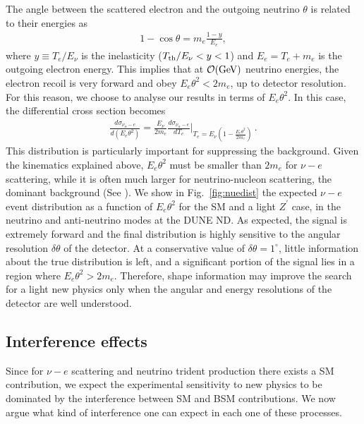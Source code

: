 The angle between the scattered electron and the outgoing neutrino $\theta$ is related to their energies as 
%
\begin{align*} 
1 - \cos{\theta} = m_e \frac{1 - y}{E_e}, 
\end{align*}
%
where $y \equiv T_e/E_{\nu}$ is the inelasticity ($T_{\rm th}/E_{\nu}<y<1$) and $E_e=T_e+m_e$ is the outgoing electron energy. This implies that at ${\cal O}(\rm GeV)$ neutrino energies, the electron recoil is very forward and obey $E_e \theta^2 < 2 m_e$, up to detector resolution. For this reason, we choose to analyse our results in terms of  $E_e \theta^2$. In this case, the differential cross section becomes
\begin{eqnarray}
  \frac{d\sigma_{\nu_{\alpha}-e}}{d(E_e\theta^2)} =\frac{E_\nu}{2m_e}\frac{d\sigma_{\nu_{\alpha}-e}}{dT_e} \Bigg|_{T_e=E_\nu(1-\frac{E_e\theta^2}{2m_e})}\,.
\end{eqnarray}
This distribution is particularly important for suppressing the background. Given the kinematics explained above, $E_e\theta^2$ must be smaller than $2m_e$ for $\nu-e$ scattering, while it is often much larger for neutrino-nucleon scattering, the dominant background (See ). We show in Fig.~\ref{fig:nuedist} the expected $\nu-e$ 
event distribution as a function of $E_e\theta^2$ for the SM and a light $Z^\prime$ case, in the neutrino and anti-neutrino modes at the DUNE ND. As expected, the signal is extremely forward and the final distribution is highly sensitive to the angular resolution $\delta\theta$ of the detector. At a conservative value of $\delta\theta = 1^\circ$, little information about the true distribution is left, and a significant portion of the signal lies in a region where $E_e\theta^2 > 2 m_e$. Therefore, shape information may improve the search for a light new physics only when the angular and energy resolutions of the detector are well understood. 

\subsection{Interference effects}

Since for $\nu-e$ scattering and neutrino trident production there exists a SM contribution, we expect the experimental sensitivity to new physics to be dominated by the interference between SM and BSM contributions. We now argue what kind of interference one can expect in each one of these processes.

